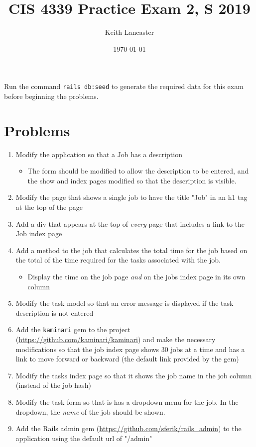 \documentclass[11pt]{article}
\author{Keith Lancaster}
\date{\today}
\title{CIS 4339 Practice Exam 2, S 2019}
\begin{document}
\maketitle
Run the command \texttt{rails db:seed} to generate the required data for this exam before beginning the problems.

\section{Problems}
\label{sec:orgb5b90c6}
\begin{enumerate}
\item Modify the application so that a Job has a description
\begin{itemize}
\item The form should be modified to allow the description to be entered, and the
show and index pages modified so that the description is visible.
\end{itemize}
\item Modify the page that shows a single job to have the title "Job" in an h1 tag
at the top of the page
\item Add a div that appears at the top of \emph{every} page that includes a link to the
Job index page
\item Add a method to the job that calculates the total time for the job based
on the total of the time required for the tasks associated with the job.
\begin{itemize}
\item Display the time on the job page \emph{and} on the jobs index page in its own column
\end{itemize}
\item Modify the task model so that an error message is displayed if the task description is not entered
\item Add the \texttt{kaminari} gem to the project
(\url{https://github.com/kaminari/kaminari}) and make the necessary
modifications so that the job index page shows 30 jobs at a time and has a
link to move forward or backward (the default link provided by the gem)
\item Modify the tasks index page so that it shows the job name in the job
column (instead of the job hash)
\item Modify the task form so that is has a dropdown menu for the job. In the
dropdown, the \emph{name} of the job should be shown.
\item Add the Rails admin gem (\url{https://github.com/sferik/rails\_admin}) to the
application using the default url of "/admin"
\end{enumerate}
\end{document}

